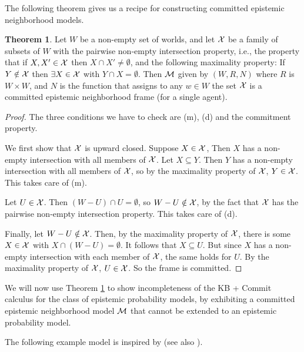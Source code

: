 \documentclass[12pt]{article}
\theoremstyle{definition}
\newtheorem{theorem}{Theorem}[section]
\newcommand{\M}{{\cal M}}      %
\begin{document}
The following theorem gives us a recipe for constructing committed
epistemic neighborhood models. 

\begin{theorem}\label{pneiCommitModel}
  Let $W$ be a non-empty set of worlds, and let ${\cal X}$ be a family
  of subsets of $W$ with the pairwise non-empty intersection property,
  i.e., the property that if $X,X' \in {\cal X}$ then $X \cap
  X' \neq \emptyset$, and the following maximality property: If
  $Y \notin {\cal X}$ then $\exists X \in {\cal X}$ with $Y \cap X
  = \emptyset$.  Then $\M$ given by $(W,R,N)$ where $R$ is $W\times
  W$, and $N$ is the function that assigns to any $w \in W$ the set
  ${\cal X}$ is a committed epistemic neighborhood frame (for a
  single agent).
\end{theorem}
\begin{proof}
The three conditions we have to check are (m), (d) and the commitment property. 

We first show that ${\cal X}$ is upward closed. Suppose $X \in {\cal X}$, 
Then $X$ has a non-empty intersection with all members of ${\cal X}$. 
Let $X \subseteq Y$. Then $Y$ has a non-empty intersection with all members of ${\cal X}$,
so by the maximality property of ${\cal X}$, $Y \in {\cal X}$. This takes care of (m). 

Let $U \in {\cal X}$. Then $(W - U) \cap U = \emptyset$, so $W-U \notin
{\cal X}$, by the fact that ${\cal X}$ has the pairwise non-empty
intersection property. This takes care of (d).

Finally, let $W - U \notin  {\cal X}$. Then, by the maximality property of 
${\cal X}$, there is some $X \in {\cal X}$ with $X \cap (W-U) = \emptyset$. 
It follows that $X \subseteq U$. But since $X$ has a non-empty intersection with 
each member of ${\cal X}$, the same holds for $U$. By the maximality property 
of ${\cal X}$, $U \in {\cal X}$. So the frame is committed. 
\end{proof}

We will now use Theorem \ref{pneiCommitModel} to show incompleteness
of the KB + Commit calculus for the class of epistemic probability
models, by exhibiting a committed epistemic neighborhood model $\M$
that cannot be extended to an epistemic probability model.

The following example model is inspired by
\cite{WalleyFine1979:vomacp} (see also \cite{Herzig2003:mpbaa}).
\end{document}
